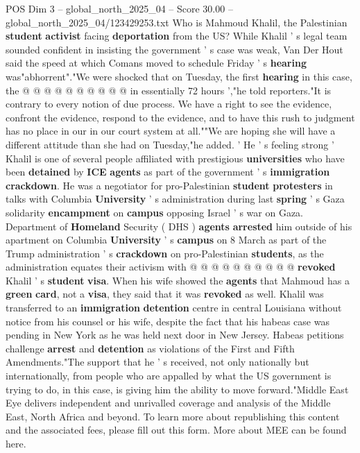 \begin{textsample}{POS Dim 3 – global\_north\_2025\_04 – Score 30.00 – global\_north\_2025\_04/123429253.txt}
Who is Mahmoud Khalil, the Palestinian \textbf{student} \textbf{activist} facing \textbf{deportation} from the US?
While Khalil ' s legal team sounded confident in insisting the government ' s case was weak, Van Der Hout said the speed at which Comans moved to schedule Friday ' s \textbf{hearing} was"abhorrent"."We were shocked that on Tuesday, the first \textbf{hearing} in this case, the @ @ @ @ @ @ @ @ @ @ in essentially 72 hours ',"he told reporters."It is contrary to every notion of due process.
We have a right to see the evidence, confront the evidence, respond to the evidence, and to have this rush to judgment has no place in our in our court system at all.""We are hoping she will have a different attitude than she had on Tuesday,"he added. ' He ' s feeling strong ' Khalil is one of several people affiliated with prestigious \textbf{universities} who have been \textbf{detained} by \textbf{ICE} \textbf{agents} as part of the government ' s \textbf{immigration} \textbf{crackdown}.
He was a negotiator for pro-Palestinian \textbf{student} \textbf{protesters} in talks with Columbia \textbf{University} ' s administration during last \textbf{spring} ' s Gaza solidarity \textbf{encampment} on \textbf{campus} opposing Israel ' s war on Gaza.
Department of \textbf{Homeland} Security ( DHS ) \textbf{agents} \textbf{arrested} him outside of his apartment on Columbia \textbf{University} ' s \textbf{campus} on 8 March as part of the Trump administration ' s \textbf{crackdown} on pro-Palestinian \textbf{students}, as the administration equates their activism with @ @ @ @ @ @ @ @ @ @ \textbf{revoked} Khalil ' s \textbf{student} \textbf{visa}.
When his wife showed the \textbf{agents} that Mahmoud has a \textbf{green} \textbf{card}, not a \textbf{visa}, they said that it was \textbf{revoked} as well.
Khalil was transferred to an \textbf{immigration} \textbf{detention} centre in central Louisiana without notice from his counsel or his wife, despite the fact that his habeas case was pending in New York as he was held next door in New Jersey.
Habeas petitions challenge \textbf{arrest} and \textbf{detention} as violations of the First and Fifth Amendments."The support that he ' s received, not only nationally but internationally, from people who are appalled by what the US government is trying to do, in this case, is giving him the ability to move forward."Middle East Eye delivers independent and unrivalled coverage and analysis of the Middle East, North Africa and beyond.
To learn more about republishing this content and the associated fees, please fill out this form.
More about MEE can be found here.

\end{textsample}
